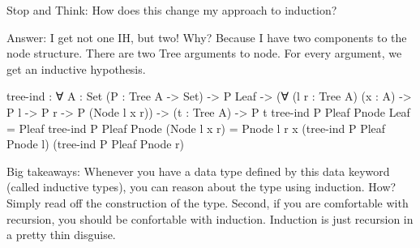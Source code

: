 \documentclass{lecturenotes}
\begin{document}
\vspace{0.2in}

\noindent Stop and Think: How does this change my approach to induction?

\noindent Answer: I get not one IH, but two! Why? Because I have two components to the node structure. 
There are two Tree arguments to node. For every argument, we get an inductive hypothesis. 

\vspace{0.2in}

\begin{center}
    \begin{code}
        tree-ind : ∀ {A : Set} (P : Tree A -> Set) ->
            P Leaf -> 
            (∀ (l r : Tree A) (x : A) -> P l -> P r -> P (Node l x r)) ->
            (t : Tree A) -> P t
        tree-ind P Pleaf Pnode Leaf = Pleaf 
        tree-ind P Pleaf Pnode (Node l x r) = Pnode l r x (tree-ind P Pleaf Pnode l) (tree-ind P Pleaf Pnode r)
    \end{code}
\end{center}

\noindent Big takeaways: Whenever you have a data type defined by this data keyword (called inductive types), you can reason about the type using induction.
How? Simply read off the construction of the type. 
Second, if you  are comfortable with recursion, you should be confortable with induction.
Induction is just recursion in a pretty thin disguise. 
\end{document}
